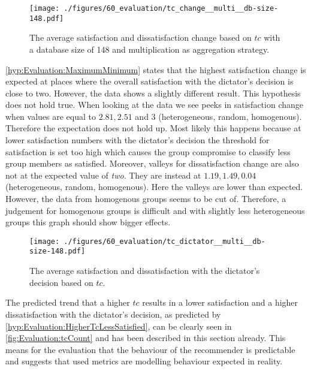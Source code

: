 \begin{figure}
    \centering
    \texttt{[image: ./figures/60\_evaluation/tc\_change\_\_multi\_\_db-size-148.pdf]}
    \caption{The average satisfaction and dissatisfaction change based on $tc$ with a database size of 148 and multiplication as aggregation strategy.}
    \label{fig:Evaluation:tcChange}
\end{figure}

\autoref{hyp:Evaluation:MaximumMinimum} states that the highest satisfaction change is expected at places where the overall satisfaction with the dictator's decision is close to two. However, the data shows a slightly different result. This hypothesis does not hold true. When looking at the data we see peeks in satisfaction change when values are equal to $2.81, 2.51$ and $3$ (heterogeneous, random, homogenous). Therefore the expectation does not hold up. Most likely this happens because at lower satisfaction numbers with the dictator's decision the threshold for satisfaction is set too high which causes the group compromise to classify less group members as satisfied. Moreover, valleys for dissatisfaction change are also not at the expected value of \textit{two}. They are instead at $1.19, 1.49, 0.04$ (heterogeneous, random, homogenous). Here the valleys are lower than expected. However, the data from homogenous groups seems to be cut of. Therefore, a judgement for homogenous groups is difficult and with slightly less heterogeneous groups this graph should show bigger effects.

\begin{figure}
    \centering
    \texttt{[image: ./figures/60\_evaluation/tc\_dictator\_\_multi\_\_db-size-148.pdf]}
    \caption{The average satisfaction and dissatisfaction with the dictator's decision based on $tc$.}
    \label{fig:Evaluation:tcCount}
\end{figure}

The predicted trend that a higher $tc$ results in a lower satisfaction and a higher dissatisfaction with the dictator's decision, as predicted by \autoref{hyp:Evaluation:HigherTcLessSatisfied}, can be clearly seen in \autoref{fig:Evaluation:tcCount} and has been described in this section already. This means for the evaluation that the behaviour of the recommender is predictable and suggests that used metrics are modelling behaviour expected in reality.

